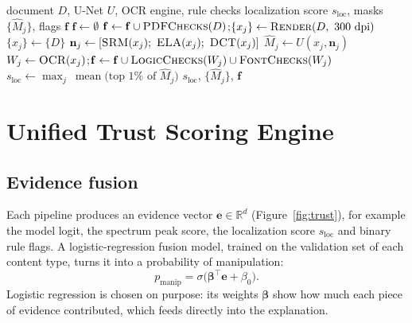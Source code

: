 \documentclass[11pt,a4paper]{article}
\begin{document}
\begin{algorithm}[htbp]
\caption{Document inference}
\label{alg:doc-infer}
\begin{algorithmic}[1]
\Require document $D$, U-Net $U$, OCR engine, rule checks
\Ensure localization score $s_{\text{loc}}$, masks $\{\hat M_j\}$, flags $\mathbf{f}$
\State $\mathbf{f}\gets\emptyset$
  \State $\mathbf{f}\gets\mathbf{f}\cup\textsc{PDFChecks}(D)$;\quad $\{x_j\}\gets\textsc{Render}(D,\ 300\text{ dpi})$
\Else
  \State $\{x_j\}\gets\{D\}$
\EndIf
{}
  \State $\mathbf{n}_j\gets[\textsc{SRM}(x_j);\ \textsc{ELA}(x_j);\ \textsc{DCT}(x_j)]$
  \State $\hat M_j\gets U(x_j,\mathbf{n}_j)$ 
  \State $W_j\gets\textsc{OCR}(x_j)$;\quad $\mathbf{f}\gets\mathbf{f}\cup\textsc{LogicChecks}(W_j)\cup\textsc{FontChecks}(W_j)$
\EndFor
\State $s_{\text{loc}}\gets\max_j\ \operatorname{mean}\bigl(\text{top }1\%\text{ of }\hat M_j\bigr)$
\State \Return $s_{\text{loc}}$, $\{\hat M_j\}$, $\mathbf{f}$
\end{algorithmic}
\end{algorithm}

\section{Unified Trust Scoring Engine}
\label{sec:trust}

\subsection{Evidence fusion}
Each pipeline produces an evidence vector $\mathbf{e}\in\mathbb{R}^{d}$ (Figure~\ref{fig:trust}),
for example the model logit, the spectrum peak score, the localization score $s_{\text{loc}}$ and
binary rule flags. A logistic-regression fusion model, trained on the validation set of each
content type, turns it into a probability of manipulation:
\begin{equation}
  p_{\text{manip}}=\sigma\bigl(\boldsymbol{\beta}^{\top}\mathbf{e}+\beta_0\bigr).
  \label{eq:fusion}
\end{equation}
Logistic regression is chosen on purpose: its weights $\boldsymbol{\beta}$ show how much each piece
of evidence contributed, which feeds directly into the explanation.
\end{document}
